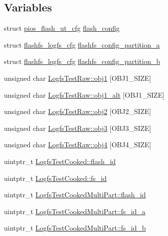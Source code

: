\subsection*{Variables}
\begin{DoxyCompactItemize}
\item 
struct \hyperlink{structpios__flash__ut__cfg}{pios\-\_\-flash\-\_\-ut\-\_\-cfg} \hyperlink{group___unit_tests_gad0a2e88bcf286c1d92cc71ae4f2f4030}{flash\-\_\-config}
\item 
struct \hyperlink{structflashfs__logfs__cfg}{flashfs\-\_\-logfs\-\_\-cfg} \hyperlink{group___unit_tests_gaba5cc3d568259a61d596b4cd0c63bad8}{flashfs\-\_\-config\-\_\-partition\-\_\-a}
\item 
struct \hyperlink{structflashfs__logfs__cfg}{flashfs\-\_\-logfs\-\_\-cfg} \hyperlink{group___unit_tests_ga6d0bc62b8797aa4539687ed6b976e503}{flashfs\-\_\-config\-\_\-partition\-\_\-b}
\item 
unsigned char \hyperlink{group___unit_tests_ga9a310807ae65fdb582ace246798d9112}{Logfs\-Test\-Raw\-::obj1} \mbox{[}O\-B\-J1\-\_\-\-S\-I\-Z\-E\mbox{]}
\item 
unsigned char \hyperlink{group___unit_tests_gab4d553b9c4a87a6f45e032b57f98a751}{Logfs\-Test\-Raw\-::obj1\-\_\-alt} \mbox{[}O\-B\-J1\-\_\-\-S\-I\-Z\-E\mbox{]}
\item 
unsigned char \hyperlink{group___unit_tests_ga8ed143a62924cbb11a0150f51b0f39e9}{Logfs\-Test\-Raw\-::obj2} \mbox{[}O\-B\-J2\-\_\-\-S\-I\-Z\-E\mbox{]}
\item 
unsigned char \hyperlink{group___unit_tests_gae2971f4ef641d737044260c4f11c1ba0}{Logfs\-Test\-Raw\-::obj3} \mbox{[}O\-B\-J3\-\_\-\-S\-I\-Z\-E\mbox{]}
\item 
unsigned char \hyperlink{group___unit_tests_ga538292c7d3fd8ffe5a32cc8b7e43d51c}{Logfs\-Test\-Raw\-::obj4} \mbox{[}O\-B\-J4\-\_\-\-S\-I\-Z\-E\mbox{]}
\item 
uintptr\-\_\-t \hyperlink{group___unit_tests_ga1180d0088fd85cca978eaed59163f626}{Logfs\-Test\-Cooked\-::flash\-\_\-id}
\item 
uintptr\-\_\-t \hyperlink{group___unit_tests_gaa47f085754c3a15dd69bcfbde0d804d7}{Logfs\-Test\-Cooked\-::fs\-\_\-id}
\item 
uintptr\-\_\-t \hyperlink{group___unit_tests_ga503c4ee9ad8abab85d6fb34d0397944c}{Logfs\-Test\-Cooked\-Multi\-Part\-::flash\-\_\-id}
\item 
uintptr\-\_\-t \hyperlink{group___unit_tests_gadeab2644468b89d495d396f0e55524e6}{Logfs\-Test\-Cooked\-Multi\-Part\-::fs\-\_\-id\-\_\-a}
\item 
uintptr\-\_\-t \hyperlink{group___unit_tests_ga2398cf58e337f70603e12a997936f0c9}{Logfs\-Test\-Cooked\-Multi\-Part\-::fs\-\_\-id\-\_\-b}
\end{DoxyCompactItemize}



